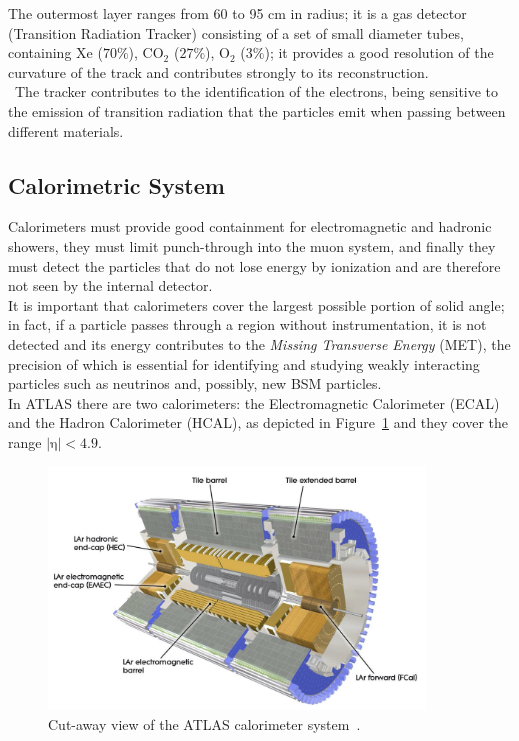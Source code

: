 \noindent The outermost layer ranges from 60 to 95 cm in radius; it is a gas detector (Transition Radiation Tracker) consisting of a set of small diameter tubes, containing $\mathrm{Xe}$ ($\mathrm{70\%}$), 
$\mathrm{CO_2}$ ($\mathrm{27\%}$),  $\mathrm{O_2}$ ($\mathrm{3\%}$); it provides a good resolution of the curvature of the track and contributes strongly to its reconstruction.\\\
The tracker contributes to the identification of the electrons, being sensitive to the emission of transition radiation that the particles emit when passing between different materials. 

\subsection{Calorimetric System}
\label{sec:CAL}
Calorimeters must provide good containment for electromagnetic and hadronic showers, they must limit punch-through into the muon system, and finally they must detect the particles that do not lose energy by ionization and are therefore not seen by the internal detector.\\
It is important that calorimeters cover the largest possible portion of solid angle; in fact, if a particle passes through a region without instrumentation, it is not detected and its energy contributes to the \textit{Missing Transverse Energy} (MET), the precision of which is essential for identifying and studying weakly interacting particles such as neutrinos and, possibly, new BSM particles. \\
In ATLAS there are two calorimeters: the Electromagnetic Calorimeter (ECAL)  and the Hadron Calorimeter (HCAL), as depicted in Figure~\ref{fig:cal} and they cover the range $\mathrm{|\eta|<4.9}$.  
\begin{figure}[h]
	\centering
	\includegraphics[width=10cm]{Chapters/CH2/figures/cal}
	\caption{Cut-away view of the ATLAS calorimeter system~\cite{ATLAS}.}
	\label{fig:cal}
\end{figure}
